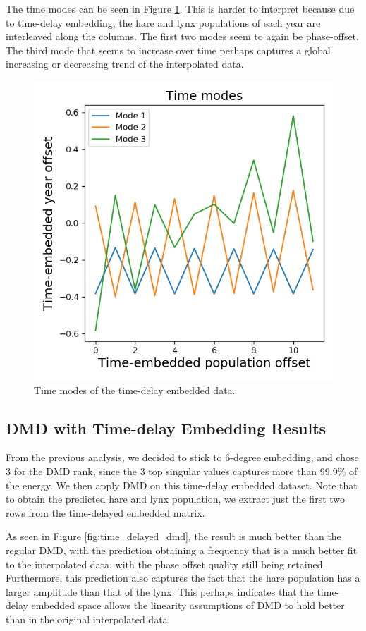 \documentclass[letterpaper, 10 pt, conference]{ieeeconf}  %
\begin{document}
The time modes can be seen in Figure \ref{fig:time_delayed_time_mode}. This is harder to interpret because due to time-delay embedding, the hare and lynx populations of each year are interleaved along the columns. The first two modes seem to again be phase-offset. The third mode that seems to increase over time perhaps captures a global increasing or decreasing trend of the interpolated data. 
\begin{figure}[htb] 
\centering
\includegraphics[width=0.97\columnwidth]{images/time_delayed_time_mode.png}
\caption{Time modes of the time-delay embedded data.}
\label{fig:time_delayed_time_mode}
\end{figure}

\subsection{DMD with Time-delay Embedding Results}
From the previous analysis, we decided to stick to 6-degree embedding, and chose 3 for the DMD rank, since the 3 top singular values captures more than 99.9\% of the energy. We then apply DMD on this time-delay embedded dataset. Note that to obtain the predicted hare and lynx population, we extract just the first two rows from the time-delayed embedded matrix.

As seen in Figure \ref{fig:time_delayed_dmd}, the result is much better than the regular DMD, with the prediction obtaining a frequency that is a much better fit to the interpolated data, with the phase offset quality still being retained. Furthermore, this prediction also captures the fact that the hare population has a larger amplitude than that of the lynx. This perhaps indicates that the time-delay embedded space allows the linearity assumptions of DMD to hold better than in the original interpolated data.
\end{document}
